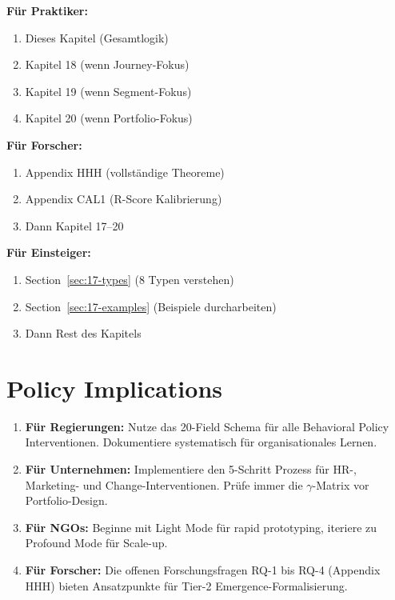 \begin{tcolorbox}[colback=gray!5!white, colframe=gray!75!black,
    title=Empfohlene Lesepfade]

\textbf{Für Praktiker:}
\begin{enumerate}[nosep]
\item Dieses Kapitel (Gesamtlogik)
\item Kapitel 18 (wenn Journey-Fokus)
\item Kapitel 19 (wenn Segment-Fokus)
\item Kapitel 20 (wenn Portfolio-Fokus)
\end{enumerate}

\textbf{Für Forscher:}
\begin{enumerate}[nosep]
\item Appendix HHH (vollständige Theoreme)
\item Appendix CAL1 (R-Score Kalibrierung)
\item Dann Kapitel 17--20
\end{enumerate}

\textbf{Für Einsteiger:}
\begin{enumerate}[nosep]
\item Section~\ref{sec:17-types} (8 Typen verstehen)
\item Section~\ref{sec:17-examples} (Beispiele durcharbeiten)
\item Dann Rest des Kapitels
\end{enumerate}

\end{tcolorbox}



\section*{Policy Implications}

\begin{enumerate}
\item \textbf{Für Regierungen:} Nutze das 20-Field Schema für alle Behavioral Policy Interventionen. Dokumentiere systematisch für organisationales Lernen.

\item \textbf{Für Unternehmen:} Implementiere den 5-Schritt Prozess für HR-, Marketing- und Change-Interventionen. Prüfe immer die $\gamma$-Matrix vor Portfolio-Design.

\item \textbf{Für NGOs:} Beginne mit Light Mode für rapid prototyping, iteriere zu Profound Mode für Scale-up.

\item \textbf{Für Forscher:} Die offenen Forschungsfragen RQ-1 bis RQ-4 (Appendix HHH) bieten Ansatzpunkte für Tier-2 Emergence-Formalisierung.
\end{enumerate}



